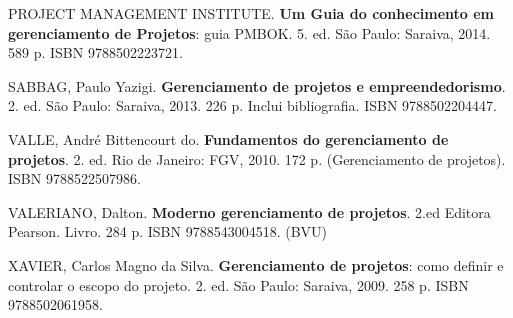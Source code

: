 \begin{pud}
	\begin{bibcomplementar}
    	
    	\item PROJECT MANAGEMENT INSTITUTE. \textbf{Um Guia do conhecimento em gerenciamento de Projetos}:  guia PMBOK\textregistered. 5. ed. São Paulo: Saraiva, 2014.  589 p. ISBN 9788502223721.
		\item SABBAG, Paulo Yazigi. \textbf{Gerenciamento de projetos e empreendedorismo}. 2. ed. São Paulo: Saraiva, 2013. 226 p. Inclui bibliografia. ISBN 9788502204447.
		\item VALLE, André Bittencourt do. \textbf{Fundamentos do gerenciamento de projetos}. 2. ed. Rio de Janeiro: FGV, 2010. 172 p. (Gerenciamento de projetos). ISBN 9788522507986.
		\item VALERIANO, Dalton. \textbf{Moderno gerenciamento de projetos}. 2.ed Editora Pearson. Livro. 284 p. ISBN 9788543004518. (BVU)
		\item XAVIER, Carlos Magno da Silva. \textbf{Gerenciamento de projetos}: como definir e controlar o escopo do projeto. 2. ed. São Paulo: Saraiva, 2009. 258 p.  ISBN 9788502061958. 	
		
	\end{bibcomplementar}
	
\end{pud}




